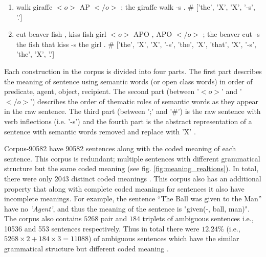\begin{enumerate}[noitemsep]
\item walk giraffe $<\!o\!>$ AP $<\!/o\!>$ ; the giraffe walk -s . \# ['the', 'X', 'X', '-s', '.']
\item cut beaver fish , kiss fish girl $<\!o\!>$ APO , APO $<\!/o\!>$ ; the beaver cut -s the fish that kiss -s the girl . \# ['the', 'X', 'X', '-s', 'the', 'X', 'that', 'X', '-s', 'the', 'X', '.']
\end{enumerate}

Each construction in the corpus is divided into four parts. The first part describes the meaning of sentence using semantic words (or open class words) in order of predicate, agent, object, recipient. The second part (between '$<\!o\!>$' and '$<\!/o\!>$') describes the order of thematic roles of semantic words as they appear in the raw sentence. The third part (between ';' and '\#') is the raw sentence with verb inflections (i.e. '-s') and the fourth part is the abstract representation of a sentence with semantic words removed and replace with 'X' \cite{xavier:2013:RT}.

Corpus-90582 have 90582 sentences along with the coded meaning of each sentence. This corpus is redundant; multiple sentences with different grammatical structure but the same coded meaning (see fig. \ref{fig:meaning_realtions}). In total, there were only 2043 distinct coded meanings \cite{xavier:2013:RT}. This corpus also has an additional property that along with complete coded meanings for sentences it also have incomplete meanings. For example, the sentence “The Ball was given to the Man” have no \textit{'Agent'}, and thus the meaning of the sentence is "given(-, ball, man)". The corpus also contains $5268$ pair and $184$ triplets of ambiguous sentences i.e., 10536 and 553 sentences respectively. Thus in total there were $12.24 \%$ (i.e., $ 5268 \times 2 + 184 \times 3 = 11088 $) of ambiguous sentences which have the similar grammatical structure but different coded meaning \cite{xavier:2013:RT}.

